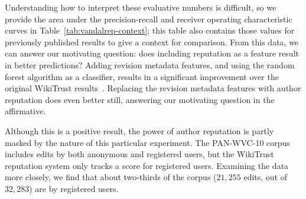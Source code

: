 Understanding how to interpret these evaluative numbers is difficult,
so we provide the area under the precision-recall and receiver operating
characteristic curves in Table~\ref{tab:vandalrep-context}; this table
also contains those values for previously published results to give a
context for comparison.
From this data, we can answer our motivating question: does including
reputation as a feature result in better predictions?
Adding revision metadata features, and using the random forest
algorithm as a classifier, results in a significant improvement over the
original WikiTrust results~\cite{Adler2010b}.
Replacing the revision metadata features with author reputation does even better still,
answering our motivating question in the affirmative.



Although this is a positive result, the power of author reputation is
partly masked by the nature of this particular experiment.
The PAN-WVC-10 corpus includes edits by both anonymous and registered
users, but the WikiTrust reputation system only tracks a score for
registered users.
Examining the data more closely, we find that about two-thirds of the
corpus ($21,255$ edits, out of $32,283$) are by registered users.


